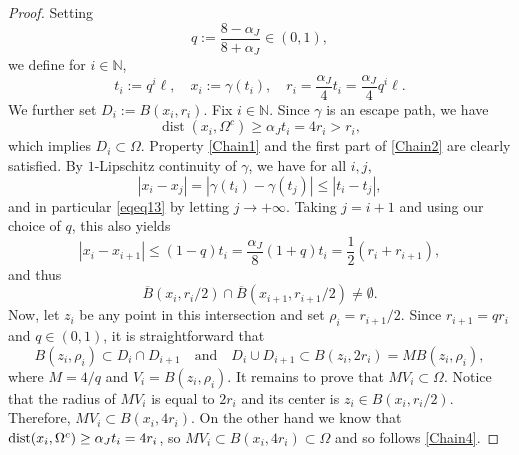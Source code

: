 \documentclass[12pt]{article}
\theoremstyle{definition}
\theoremstyle{remark}
\numberwithin{equation}{section}
\DeclareMathOperator{\dist}{dist}
\newcommand{\N}{\mathbb{N}}
\begin{document}
\begin{proof}
 
    Setting
    \begin{equation}
        q:=\frac{8-\alpha_J}{8+\alpha_J}\in(0,1),
    \end{equation}
    we define for $i\in\N$,
    \begin{equation}
        t_i:=q^i\ell,\quad x_i:=\gamma(t_i),\quad r_i=\frac{\alpha_J}{4} t_i=\frac{\alpha_J}{4} q^i\ell.
    \end{equation}
    We further set $D_i:=B(x_i,r_i)$. Fix $i\in\N$. Since $\gamma$ is an escape path, we have
    \begin{equation}
        \dist(x_i,\Omega^c)\geq \alpha_J t_i=4r_i> r_i, \label{boundInteressant}
    \end{equation}
    which implies $D_i\subset\Omega$.
    Property \ref{Chain1} and the first part of \ref{Chain2} are clearly satisfied.
    By $1$-Lipschitz continuity of $\gamma$, we have for all $i, j$,
    \begin{equation}
        |x_i-x_j|=|\gamma(t_i)-\gamma(t_j)|\leq |t_i - t_j|,
    \end{equation}
    and in particular \eqref{eqeq13} by letting $j \to +\infty$.
    Taking $j = i+1$ and using our choice of $q$, this also yields
    \begin{equation}
        |x_i-x_{i+1}|\leq (1-q)t_i=\frac{\alpha_J}{8} (1 + q) t_i= \frac{1}{2}(r_i + r_{i+1}),
    \end{equation}
    and thus
    \begin{equation}
        \overline{B}(x_i,r_i/2)\cap \overline{B}(x_{i+1},r_{i+1}{/2})\neq \emptyset.
    \end{equation}
    Now, let $z_i$ be any point in this intersection and set $\rho_i = r_{i+1}/2$.
    Since $r_{i+1} = q r_i$ and $q \in (0,1)$, it is straightforward that
    \begin{equation}
        B(z_i,\rho_i) \subset D_i \cap D_{i+1} \quad \text{and} \quad D_i \cup D_{i+1} \subset B(z_i,2r_i) = M
        B(z_i,\rho_i),
    \end{equation}
    where $M = 4/q$   and $V_i=B(z_i,\rho_i)$. It remains to prove that $MV_i\subset \Omega$. Notice that  the radius of $MV_i$ is equal to $2r_i$ and its center is $z_i\in B(x_i,r_i/2)$.  Therefore, $MV_i\subset B(x_i,4r_i)$.  On the other hand we know that ${\rm dist}(x_i, \Omega^c)\geq \alpha_Jt_i=4r_i$, so $MV_i\subset B(x_i,4r_i)\subset \Omega$ and so follows \ref{Chain4}.
    \end{proof}
\end{document}
